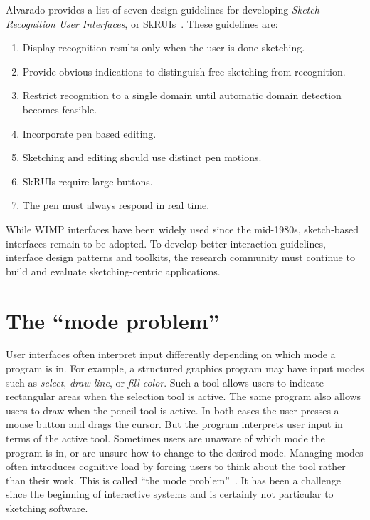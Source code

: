 Alvarado provides a list of seven design guidelines for
developing \textit{Sketch Recognition User Interfaces}, or
SkRUIs~\cite{alvarado-skrui-guidelines}. These guidelines are:

\begin{small}
\begin{enumerate}
\item Display recognition results only when the user is done sketching.
\item Provide obvious indications to distinguish free sketching 
      from recognition.
\item Restrict recognition to a single domain until automatic domain 
      detection becomes feasible.
\item Incorporate pen based editing.
\item Sketching and editing should use distinct pen motions.
\item SkRUIs require large buttons.
\item The pen must always respond in real time.
\end{enumerate}
\end{small}

While WIMP interfaces have been widely used since the mid-1980s,
sketch-based interfaces remain to be adopted. To develop better
interaction guidelines, interface design patterns and toolkits, the
research community must continue to build and evaluate
sketching-centric applications.

\section{The ``mode problem''}
\label{sec:interaction-mode-problem}

User interfaces often interpret input differently depending on which
mode a program is in. For example, a structured graphics program may
have input modes such as \textit{select}, \textit{draw line},
or \textit{fill color}. Such a tool allows users to indicate
rectangular areas when the selection tool is active. The same program
also allows users to draw when the pencil tool is active. In both
cases the user presses a mouse button and drags the cursor. But the
program interprets user input in terms of the active tool. Sometimes
users are unaware of which mode the program is in, or are unsure how
to change to the desired mode. Managing modes often introduces
cognitive load by forcing users to think about the tool rather than
their work. This is called ``the mode
problem''~\cite{tesler-mode-problem}. It has been a challenge since
the beginning of interactive systems and is certainly not particular
to sketching software.


